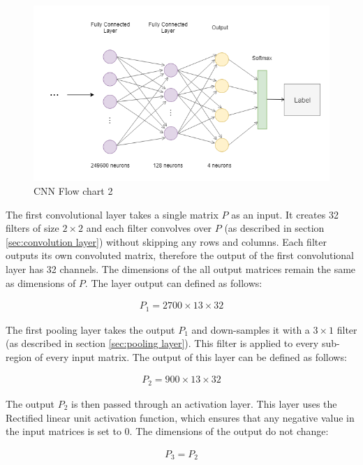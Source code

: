 \begin{figure}[H]
    \centering
    \includegraphics[width=.9\textwidth]{Pictures/Cnn_design2.png}
    \caption{CNN Flow chart 2}
    \label{fig:cnn:design2}
\end{figure}

\par
The first convolutional layer takes a single matrix $P$ as an input. It creates 32 filters of size $2 \times 2$ and each filter convolves over $P$ (as described in section \ref{sec:convolution layer}) without skipping any rows and columns. Each filter outputs its own convoluted matrix, therefore the output of the first convolutional layer has 32 channels. The dimensions of the all output matrices remain the same as dimensions of $P$. The layer output can defined as follows:

\begin{align*}
     P_{1} = 2700 \times 13 \times 32 
\end{align*}

\par
The first pooling layer takes the output $P_{1}$ and down-samples it with a $3 \times 1$ filter (as described in section \ref{sec:pooling layer}). This filter is applied to every sub-region of every input matrix. The output of this layer can be defined as follows:

\begin{align*}
     P_{2} = 900 \times 13 \times 32 
\end{align*}

\par
The output $P_{2}$ is then passed through an activation layer. This layer uses the Rectified linear unit activation function, which ensures that any negative value in the input matrices is set to 0. The dimensions of the output do not change:

\begin{align*}
     P_{3} = P_{2} 
\end{align*}

